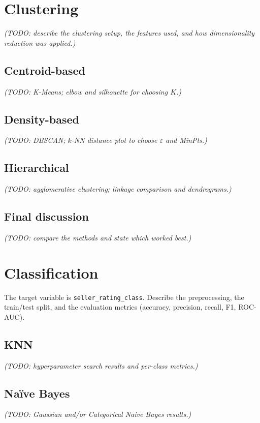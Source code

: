 \documentclass[11pt,a4paper]{article}
\numberwithin{table}{section}
\numberwithin{figure}{section}
\begin{document}
\FloatBarrier

\section{Clustering}
\label{sec:clustering}
\emph{(TODO: describe the clustering setup, the features used, and how
dimensionality reduction was applied.)}

\subsection{Centroid-based}
\emph{(TODO: K-Means; elbow and silhouette for choosing $K$.)}

\subsection{Density-based}
\emph{(TODO: DBSCAN; $k$-NN distance plot to choose $\varepsilon$ and MinPts.)}

\subsection{Hierarchical}
\emph{(TODO: agglomerative clustering; linkage comparison and dendrograms.)}

\subsection{Final discussion}
\emph{(TODO: compare the methods and state which worked best.)}

\section{Classification}
\label{sec:classification}
The target variable is \texttt{seller\_rating\_class}. Describe the
preprocessing, the train/test split, and the evaluation metrics (accuracy,
precision, recall, F1, ROC-AUC).

\subsection{KNN}
\emph{(TODO: hyperparameter search results and per-class metrics.)}

\subsection{Na\"ive Bayes}
\emph{(TODO: Gaussian and/or Categorical Naive Bayes results.)}
\end{document}
